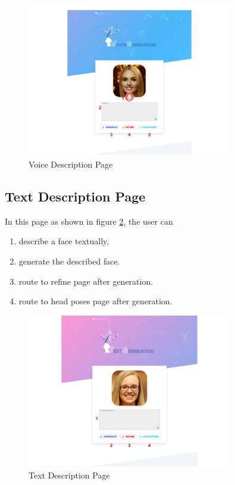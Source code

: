 \begin{figure}[H]
    \centering
    \includegraphics[width=0.8\textwidth]{images/guide/voice.png}
    \caption{Voice Description Page}
    \label{fig:user-voice}
\end{figure}


\subsection{Text Description Page}
In this page as shown in figure \ref{fig:user-text}, the user can 

\begin{enumerate}
    \item describe a face textually.
    \item generate the described face.
    \item route to refine page after generation.
    \item route to head poses page after generation.
\end{enumerate}

\begin{figure}[H]
    \centering
    \includegraphics[width=0.8\textwidth]{images/guide/text.png}
    \caption{Text Description Page}
    \label{fig:user-text}
\end{figure}


